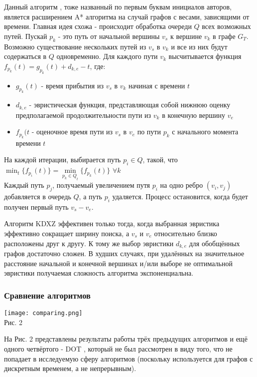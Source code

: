 \documentclass[12pt]{article}
\begin{document}
Данный алгоритм \cite{kdxz}, тоже названный по первым буквам инициалов авторов, является расширением A* алгоритма на случай графов с весами, зависящими от времени. Главная идея схожа - происходит обработка очереди $Q$ всех возможных путей. Пускай $p_k$ - это путь от начальной вершины $v_s$ к вершине $v_k$ в графе $G_T$. Возможно существование нескольких путей из $v_s$ в $v_k$ и все из них будут содержаться в $Q$ одновременно. Для каждого пути $v_k$ высчитывается функция $f_{p_k}(t)=g_{p_k}(t)+d_{k,e}-t$, где:
\begin{itemize}
    \item $g_{p_k}(t)$ - время прибытия из $v_s$ в $v_k$ начиная с времени $t$
    \item $d_{k,e}$ - эвристическая функция, представляющая собой нижнюю оценку предполагаемой продолжительности пути из $v_k$ в конечную вершину $v_e$
    \item $f_{p_k}(t$ - оценочное время пути из $v_s$ в $v_e$ по пути $p_k$ с начального момента времени $t$
\end{itemize}

На каждой итерации, выбирается путь $p_i \in Q$, такой, что $\min_{t}\{f_{p_i}(t)\} = \min\limits_{p_k \in Q}_t\{f_{p_k}(t)\}$  $\forall k$ \\
Каждый путь $p_j$, получаемый увеличением путя $p_i$ на одно ребро $(v_i,v_j)$ добавляется в очередь $Q$, а путь $p_i$ удаляется. Процесс остановится, когда будет получен первый путь $v_s-v_e$.

Алгоритм KDXZ эффективен только тогда, когда выбранная эвристика эффективно сокращает ширину поиска, а $v_s$ и $v_e$ относительно близко расположены друг к другу. К тому же выбор эвристики $d_{k,e}$ для обобщённых графов достаточно сложен. В худших случаях, при удалённых на значительное расстояние начальной и конечной вершинах и/или выборе не оптимальной эвристики получаемая сложность алгоритма экспоненциальна.

\subsubsection{Сравнение алгоритмов}

\begin{center}
  \texttt{[image: comparing.png]} \\
  Рис. 2
\end{center}

На Рис. 2 представлены результаты работы трёх предыдущих алгоритмов и ещё одного четвёртого - DOT \cite{dot}, который не был рассмотрен в виду того, что не попадает в исследуемую сферу алгоритмов (поскольку используется для графов с дискретным временем, а не непрерывным). 
\end{document}
